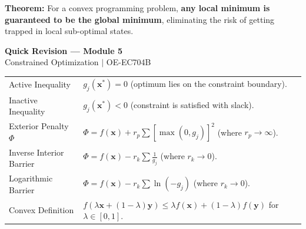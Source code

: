 \documentclass[12pt,a4paper]{article}
\renewcommand{\arraystretch}{1.45}
\begin{document}
\textbf{Theorem:} For a convex programming problem, \textbf{any local minimum is guaranteed to be the global minimum}, eliminating the risk of getting trapped in local sub-optimal states.

\newpage

\begin{center}
  {\large\bfseries\color{myred} Quick Revision --- Module 5}\\[3pt]
  {\small\color{mydark} Constrained Optimization $|$ OE-EC704B}
\end{center}
\noindent{\color{myred}\rule{\linewidth}{1.2pt}}
\vspace{4pt}

\begin{tcolorbox}[formulabox, title={\textbf{Key Concepts \& Formulations}}]
\renewcommand{\arraystretch}{1.45}
\begin{tabularx}{\linewidth}{B{5.0cm} X}
Active Inequality & $g_j(\mathbf{x}^*) = 0$ \quad (optimum lies on the constraint boundary). \\[4pt]
Inactive Inequality & $g_j(\mathbf{x}^*) < 0$ \quad (constraint is satisfied with slack). \\[4pt]
Exterior Penalty $\Phi$ & $\Phi = f(\mathbf{x}) + r_p \sum [\max(0, g_j)]^2$ \quad (where $r_p \to \infty$). \\[4pt]
Inverse Interior Barrier & $\Phi = f(\mathbf{x}) - r_k \sum \frac{1}{g_j}$ \quad (where $r_k \to 0$). \\[4pt]
Logarithmic Barrier & $\Phi = f(\mathbf{x}) - r_k \sum \ln(-g_j)$ \quad (where $r_k \to 0$). \\[4pt]
Convex Definition & $f(\lambda \mathbf{x} + (1-\lambda)\mathbf{y}) \le \lambda f(\mathbf{x}) + (1-\lambda)f(\mathbf{y})$ for $\lambda \in [0, 1]$. \\
\end{tabularx}
\end{tcolorbox}
\end{document}

